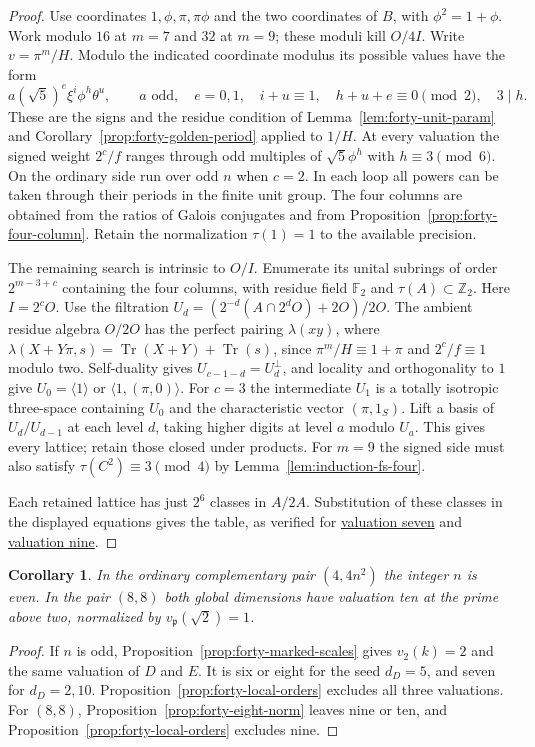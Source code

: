 \documentclass[11pt,reqno]{amsart}
\newcommand{\codecheck}[2]{\href{https://github.com/sebastienpalcoux/grothendieck-ring-classification/blob/d5750105bb5758f3ad38d2e5464dfcc12c019816/supplements/rank6/sphericality/#1}{#2}}
\newtheorem{corollary}[theorem]{Corollary}
\theoremstyle{remark}\newtheorem{remark}[theorem]{Remark}
\numberwithin{equation}{section}
\begin{document}
\begin{proof}
Use coordinates $1,\phi,\pi,\pi\phi$ and the two coordinates of
$B$, with $\phi^2=1+\phi$. Work modulo $16$ at $m=7$ and $32$
at $m=9$; these moduli kill $O/4I$. Write
$v=\pi^m/H$. Modulo the indicated coordinate modulus its possible
values have the form
\[
 a(\sqrt5)^e\xi^i\phi^h\theta^u,\qquad a\text{ odd},\quad
 e=0,1,\quad i+u\equiv1,\quad h+u+e\equiv0\pmod2,\quad 3\mid h.
\]
These are the signs and the residue condition of
Lemma~\ref{lem:forty-unit-param} and Corollary~\ref{prop:forty-golden-period}
applied to $1/H$.
At every valuation the signed weight $2^c/f$ ranges through odd
multiples of $\sqrt5\phi^h$ with $h\equiv3\pmod6$. On the ordinary
side run over odd $n$ when $c=2$. In each loop all powers can be
taken through their periods in the finite unit group. The four
columns are obtained from the ratios of Galois conjugates and from
Proposition~\ref{prop:forty-four-column}.
Retain the normalization $\tau(1)=1$ to the available precision.

The remaining search is intrinsic to $O/I$. Enumerate its unital
subrings of order $2^{m-3+c}$ containing the four columns, with
residue field $\mathbb F_2$ and $\tau(A)\subset\mathbb Z_2$.
Here $I=2^cO$. Use the filtration
$U_d=(2^{-d}(A\cap2^dO)+2O)/2O$. The ambient residue algebra $O/2O$ has the perfect pairing
$\lambda(xy)$, where
$\lambda(X+Y\pi,s)=\operatorname{Tr}(X+Y)+\operatorname{Tr}(s)$,
since $\pi^m/H\equiv1+\pi$ and $2^c/f\equiv1$ modulo two.
Self-duality gives $U_{c-1-d}=U_d^\perp$, and locality and
orthogonality to $1$ give $U_0=\langle1\rangle$ or
$\langle1,(\pi,0)\rangle$. For $c=3$ the intermediate $U_1$ is
a totally isotropic three-space containing $U_0$ and the
characteristic vector $(\pi,1_S)$. Lift a basis of $U_d/U_{d-1}$
at each level $d$, taking higher digits at level $a$ modulo $U_a$.
This gives every lattice; retain those closed under products.
For $m=9$ the signed side must also satisfy
$\tau(C^2)\equiv3\pmod4$ by Lemma~\ref{lem:induction-fs-four}.

Each retained lattice has just $2^6$ classes in $A/2A$. Substitution
of these classes in the displayed equations gives the table, as
verified for
\codecheck{field_checks/forty/quadratic40.py}{valuation seven} and
\codecheck{field_checks/forty/primitive9.py}{valuation nine}.
\end{proof}

\begin{corollary}\label{cor:odd-forty-excluded}
In the ordinary complementary pair $(4,4n^2)$ the integer $n$ is even. In the pair $(8,8)$ both global dimensions have valuation ten at the prime above two, normalized by $v_{\mathfrak p}(\sqrt2)=1$.
\end{corollary}
\begin{proof}
If $n$ is odd, Proposition~\ref{prop:forty-marked-scales} gives $v_2(k)=2$ and the same valuation of $D$ and $E$. It is six or eight for the seed $d_D=5$, and seven for $d_D=2,10$. Proposition~\ref{prop:forty-local-orders} excludes all three valuations. For $(8,8)$, Proposition~\ref{prop:forty-eight-norm} leaves nine or ten, and Proposition~\ref{prop:forty-local-orders} excludes nine.
\end{proof}
\end{document}
